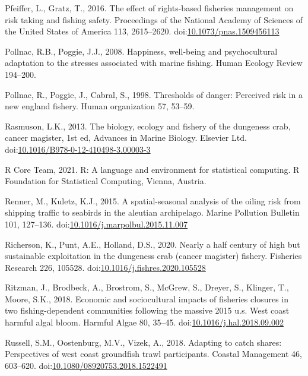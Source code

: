 \documentclass[]{elsarticle} %
\begin{document}
\leavevmode\hypertarget{ref-Pfeiffer2016}{}%
Pfeiffer, L., Gratz, T., 2016. The effect of rights-based fisheries
management on risk taking and fishing safety. Proceedings of the
National Academy of Sciences of the United States of America 113,
2615--2620.
doi:\href{https://doi.org/10.1073/pnas.1509456113}{10.1073/pnas.1509456113}

\leavevmode\hypertarget{ref-Pollnac2008}{}%
Pollnac, R.B., Poggie, J.J., 2008. Happiness, well-being and
psychocultural adaptation to the stresses associated with marine
fishing. Human Ecology Review 194--200.

\leavevmode\hypertarget{ref-Pollnac1998}{}%
Pollnac, R., Poggie, J., Cabral, S., 1998. Thresholds of danger:
Perceived risk in a new england fishery. Human organization 57, 53--59.

\leavevmode\hypertarget{ref-Rasmuson2013}{}%
Rasmuson, L.K., 2013. The biology, ecology and fishery of the dungeness
crab, cancer magister, 1st ed, Advances in Marine Biology. Elsevier Ltd.
doi:\href{https://doi.org/10.1016/B978-0-12-410498-3.00003-3}{10.1016/B978-0-12-410498-3.00003-3}

\leavevmode\hypertarget{ref-RCoreTeam2021}{}%
R Core Team, 2021. R: A language and environment for statistical
computing. R Foundation for Statistical Computing, Vienna, Austria.

\leavevmode\hypertarget{ref-Renner2015}{}%
Renner, M., Kuletz, K.J., 2015. A spatial-seasonal analysis of the
oiling risk from shipping traffic to seabirds in the aleutian
archipelago. Marine Pollution Bulletin 101, 127--136.
doi:\href{https://doi.org/10.1016/j.marpolbul.2015.11.007}{10.1016/j.marpolbul.2015.11.007}

\leavevmode\hypertarget{ref-Richerson2020}{}%
Richerson, K., Punt, A.E., Holland, D.S., 2020. Nearly a half century of
high but sustainable exploitation in the dungeness crab (cancer
magister) fishery. Fisheries Research 226, 105528.
doi:\href{https://doi.org/10.1016/j.fishres.2020.105528}{10.1016/j.fishres.2020.105528}

\leavevmode\hypertarget{ref-Ritzman2018}{}%
Ritzman, J., Brodbeck, A., Brostrom, S., McGrew, S., Dreyer, S.,
Klinger, T., Moore, S.K., 2018. Economic and sociocultural impacts of
fisheries closures in two fishing-dependent communities following the
massive 2015 u.s. West coast harmful algal bloom. Harmful Algae 80,
35--45.
doi:\href{https://doi.org/10.1016/j.hal.2018.09.002}{10.1016/j.hal.2018.09.002}

\leavevmode\hypertarget{ref-Russell2018}{}%
Russell, S.M., Oostenburg, M.V., Vizek, A., 2018. Adapting to catch
shares: Perspectives of west coast groundfish trawl participants.
Coastal Management 46, 603--620.
doi:\href{https://doi.org/10.1080/08920753.2018.1522491}{10.1080/08920753.2018.1522491}
\end{document}
